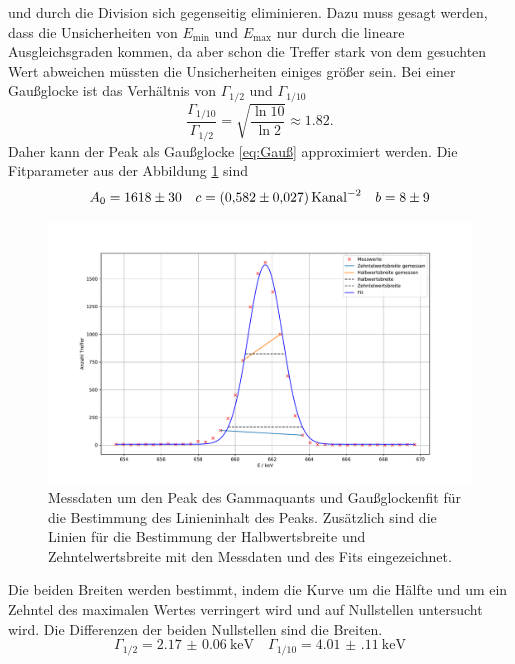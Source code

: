 und durch die Division sich gegenseitig eliminieren. Dazu muss gesagt werden, dass die Unsicherheiten von $E_{\text{min}}$ und
$E_{\text{max}}$ nur durch die lineare Ausgleichsgraden kommen, da aber schon die Treffer stark von dem gesuchten Wert abweichen müssten die 
Unsicherheiten einiges größer sein.
Bei einer Gaußglocke ist das Verhältnis von $\Gamma_{1/2}$ und $\Gamma_{1/10}$ 
\begin{equation*}
  \frac{\Gamma_{1/10}}{\Gamma_{1/2}}= \sqrt{\frac{\ln{10}}{\ln{2}}} \approx \num{1.82}.
\end{equation*}
Daher kann der Peak als Gaußglocke \eqref{eq:Gauß} approximiert werden. 
Die Fitparameter aus der Abbildung \ref{fig:02_fit} sind 
\begin{equation*}
  A_0 = \num{1618(30)}\quad c = \SI{0.582(27  )}{Kanal^{-2}} \quad b = \num{8(9)}
\end{equation*}
\FloatBarrier
\begin{figure}
  \centering
  \caption{Messdaten um den Peak des Gammaquants und Gaußglockenfit für die Bestimmung des Linieninhalt des Peaks. Zusätzlich sind die 
  Linien für die Bestimmung der Halbwertsbreite und Zehntelwertsbreite mit den Messdaten und des Fits eingezeichnet.}
  \label{fig:02_fit}
  \includegraphics[width=\textwidth,keepaspectratio]{figure/02_peak_fit.pdf}
\end{figure}
\FloatBarrier
Die beiden Breiten werden bestimmt, indem die Kurve um die Hälfte und um ein Zehntel des maximalen Wertes verringert wird und auf Nullstellen 
untersucht wird.
Die Differenzen der beiden Nullstellen sind die Breiten.
\begin{equation*}
  \Gamma_{1/2} = \SI{2.17(6)}{\kilo\eV}\quad \Gamma_{1/10} = \SI{4.01(11)}{\kilo\eV}
\end{equation*}
